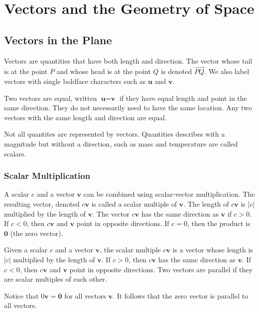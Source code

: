 \documentclass[../calc3.tex]{subfiles}
\begin{document}
\chapter{Vectors and the Geometry of Space}
\section{Vectors in the Plane}
Vectors are quantities that have both length and direction. The vector whose tail is at the point $P$ and whose head is at the point $Q$ is denoted 
$\vec{PQ}$. We also label vectors with single boldface characters such as $\textbf{u}$ and $\textbf{v}$.

Two vectors are equal, written $\textbf{u}=\textbf{v}$ if they have equal length and point in the same direction. They do not necessarily need 
to have the same location. Any two vectors with the same length and direction are equal.

Not all quantites are represented by vectors. Quantities describes with a magnitude but without a direction, such as mass and temperature are called scalars.

\subsection*{Scalar Multiplication}
A scalar $c$ and a vector $\textbf{v}$ can be combined using scalar-vector multiplication. The resulting vector, denoted $c\textbf{v}$ is called a scalar multiple of $\textbf{v}$.
The length of $c\textbf{v}$ is $|c|$ multiplied by the length of $\textbf{v}$. The vector $c\textbf{v}$ has the same direction as $\textbf{v}$ if $c>0$. If $c<0$, then $c\textbf{v}$ and $\textbf{v}$ point in opposite directions.
If $c=0$, then the product is $\textbf{0}$ (the zero vector).

\begin{definition}
    Given a scalar $c$ and a vector $\textbf{v}$, the scalar multiple $c\textbf{v}$ is a vector whose length is $|c|$ multiplied by the length of $\textbf{v}$. If $c>0$, then $c\textbf{v}$ has the same direction as $\textbf{v}$. If $c<0$, then $c\textbf{v}$ and $\textbf{v}$ point in opposite directions.
    Two vectors are parallel if they are scalar multiples of each other.    
\end{definition}

Notice that $0\textbf{v}=\textbf{0}$ for all vectors $\textbf{v}$. It follows that the zero vector is parallel to all vectors.
\end{document}
